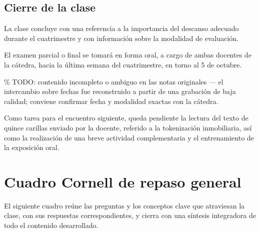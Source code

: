 \documentclass[12pt,oneside]{book}
\begin{document}
\section{Cierre de la clase}

La clase concluye con una referencia a la importancia del descanso adecuado durante el cuatrimestre y con información sobre la modalidad de evaluación.

\begin{note}
El examen parcial o final se tomará en forma oral, a cargo de ambas docentes de la cátedra, hacia la última semana del cuatrimestre, en torno al 5 de octubre.

\% TODO: contenido incompleto o ambiguo en las notas originales — el intercambio sobre fechas fue reconstruido a partir de una grabación de baja calidad; conviene confirmar fecha y modalidad exactas con la cátedra.
\end{note}

Como tarea para el encuentro siguiente, queda pendiente la lectura del texto de quince carillas enviado por la docente, referido a la tokenización inmobiliaria, así como la realización de una breve actividad complementaria y el entrenamiento de la exposición oral.

\chapter{Cuadro Cornell de repaso general}

El siguiente cuadro reúne las preguntas y los conceptos clave que atraviesan la clase, con sus respuestas correspondientes, y cierra con una síntesis integradora de todo el contenido desarrollado.
\end{document}

